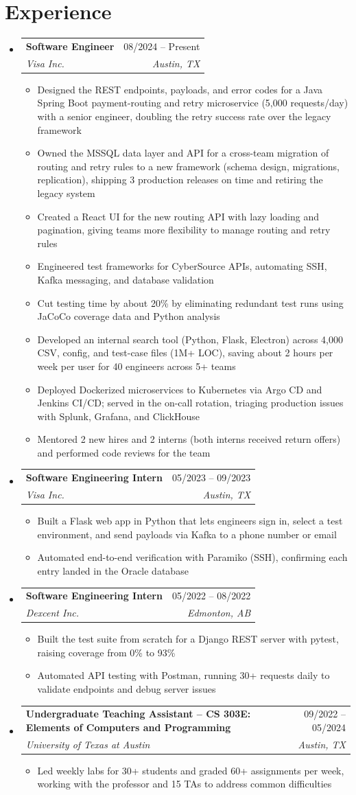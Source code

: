 \documentclass[letterpaper]{article}
\makeatletter
\newcommand{\resumeItem}[1]{
  \item\small{
    {#1 \vspace{-2pt}}
  }
}
\newcommand{\resumeSubheading}[4]{
  \vspace{-2pt}\item
    \begin{tabular*}{0.97\textwidth}[t]{l@{\extracolsep{\fill}}r}
      \textbf{#1} & #2 \\
      \textit{\small#3} & \textit{\small #4} \\
    \end{tabular*}\vspace{-7pt}
}
\newcommand{\resumeSubHeadingListStart}{\begin{itemize}[leftmargin=0.15in, label={}]}
\newcommand{\resumeSubHeadingListEnd}{\end{itemize}}
\newcommand{\resumeItemListStart}{\begin{itemize}}
\newcommand{\resumeItemListEnd}{\end{itemize}\vspace{-5pt}}
\makeatother
\begin{document}
\section{Experience}
\resumeSubHeadingListStart
  \resumeSubheading
    {Software Engineer}{08/2024 -- Present}
    {Visa Inc.}{Austin, TX}
    \resumeItemListStart
    \resumeItem{Designed the REST endpoints, payloads, and error codes for a Java Spring Boot payment-routing and retry microservice (5,000 requests/day) with a senior engineer, doubling the retry success rate over the legacy framework}
    \resumeItem{Owned the MSSQL data layer and API for a cross-team migration of routing and retry rules to a new framework (schema design, migrations, replication), shipping 3 production releases on time and retiring the legacy system}
    \resumeItem{Created a React UI for the new routing API with lazy loading and pagination, giving teams more flexibility to manage routing and retry rules}
    \resumeItem{Engineered test frameworks for CyberSource APIs, automating SSH, Kafka messaging, and database validation}
    \resumeItem{Cut testing time by about 20\% by eliminating redundant test runs using JaCoCo coverage data and Python analysis}
    \resumeItem{Developed an internal search tool (Python, Flask, Electron) across 4,000 CSV, config, and test-case files (1M+ LOC), saving about 2 hours per week per user for 40 engineers across 5+ teams}
    \resumeItem{Deployed Dockerized microservices to Kubernetes via Argo CD and Jenkins CI/CD; served in the on-call rotation, triaging production issues with Splunk, Grafana, and ClickHouse}
    \resumeItem{Mentored 2 new hires and 2 interns (both interns received return offers) and performed code reviews for the team}
    \resumeItemListEnd
  \resumeSubheading
    {Software Engineering Intern}{05/2023 -- 09/2023}
    {Visa Inc.}{Austin, TX}
    \resumeItemListStart
    \resumeItem{Built a Flask web app in Python that lets engineers sign in, select a test environment, and send payloads via Kafka to a phone number or email}
    \resumeItem{Automated end-to-end verification with Paramiko (SSH), confirming each entry landed in the Oracle database}
    \resumeItemListEnd
  \resumeSubheading
    {Software Engineering Intern}{05/2022 -- 08/2022}
    {Dexcent Inc.}{Edmonton, AB}
    \resumeItemListStart
    \resumeItem{Built the test suite from scratch for a Django REST server with pytest, raising coverage from 0\% to 93\%}
    \resumeItem{Automated API testing with Postman, running 30+ requests daily to validate endpoints and debug server issues}
    \resumeItemListEnd
  \resumeSubheading
    {Undergraduate Teaching Assistant -- CS 303E: Elements of Computers and Programming}{09/2022 -- 05/2024}
    {University of Texas at Austin}{Austin, TX}
    \resumeItemListStart
    \resumeItem{Led weekly labs for 30+ students and graded 60+ assignments per week, working with the professor and 15 TAs to address common difficulties}
    \resumeItemListEnd
\resumeSubHeadingListEnd
\end{document}
